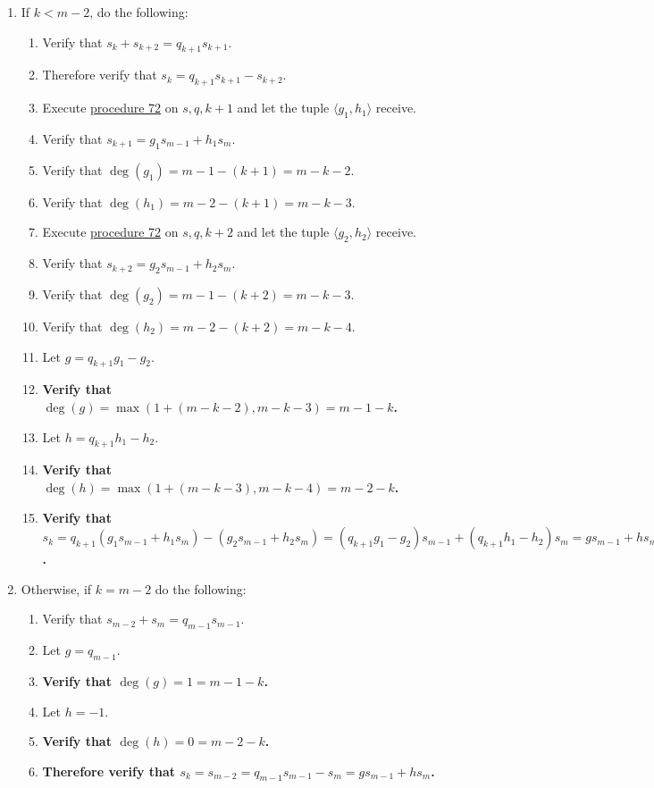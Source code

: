 \documentclass[twocolumn]{article}
\begin{document}
				\begin{enumerate}
					\item If $k<m-2$, do the following:
					\begin{enumerate}
						\item Verify that $s_k+s_{k+2}=q_{k+1}s_{k+1}$.
						\item Therefore verify that $s_k=q_{k+1}s_{k+1}-s_{k+2}$.
						\item Execute \hyperref[sec:procedure 72]{procedure 72} on $s,q,k+1$ and let the tuple $\langle g_1,h_1\rangle$ receive.
						\item Verify that $s_{k+1}=g_1s_{m-1}+h_1s_m$.
						\item Verify that $\deg(g_1)=m-1-(k+1)=m-k-2$.
						\item Verify that $\deg(h_1)=m-2-(k+1)=m-k-3$.
						\item Execute \hyperref[sec:procedure 72]{procedure 72} on $s,q,k+2$ and let the tuple $\langle g_2,h_2\rangle$ receive.
						\item Verify that $s_{k+2}=g_2s_{m-1}+h_2s_m$.
						\item Verify that $\deg(g_2)=m-1-(k+2)=m-k-3$.
						\item Verify that $\deg(h_2)=m-2-(k+2)=m-k-4$.
						\item Let $g=q_{k+1}g_1-g_2$.
						\item \textbf{Verify that $\deg(g)=\max(1+(m-k-2),m-k-3)=m-1-k$.}
						\item Let $h=q_{k+1}h_1-h_2$.
						\item \textbf{Verify that $\deg(h)=\max(1+(m-k-3),m-k-4)=m-2-k$.}
						\item \textbf{Verify that $s_k=q_{k+1}(g_1s_{m-1}+h_1s_m)-(g_2s_{m-1}+h_2s_m)=(q_{k+1}g_1-g_2)s_{m-1}+(q_{k+1}h_1-h_2)s_m=gs_{m-1}+hs_m$.}
					\end{enumerate}
					\item Otherwise, if $k=m-2$ do the following:
					\begin{enumerate}
						\item Verify that $s_{m-2}+s_m=q_{m-1}s_{m-1}$.
						\item Let $g=q_{m-1}$.
						\item \textbf{Verify that $\deg(g)=1=m-1-k$.}
						\item Let $h=-1$.
						\item \textbf{Verify that $\deg(h)=0=m-2-k$.}
						\item \textbf{Therefore verify that $s_k=s_{m-2}=q_{m-1}s_{m-1}-s_m=gs_{m-1}+hs_m$.}

\end{enumerate}
\end{enumerate}
\end{document}
